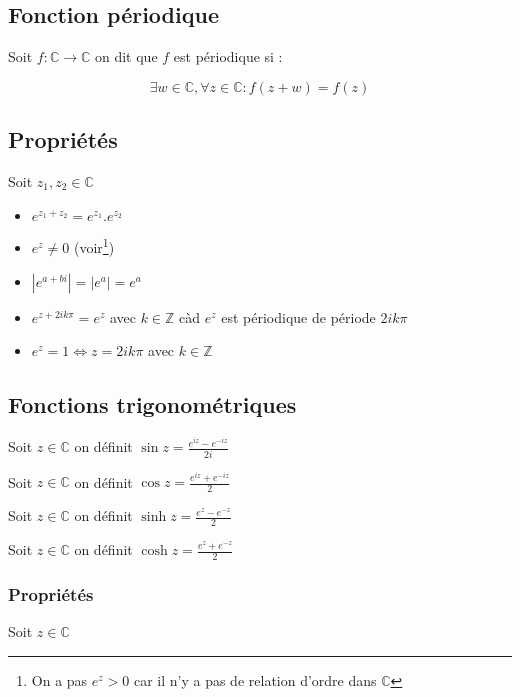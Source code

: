 \documentclass[a4paper,10pt]{report}
\newcommand{\ap}{\rightarrow}
\newcommand{\C}{\mathbb{C}}
\newcommand{\Z}{\mathbb{Z}}
\newcommand{\ioi}{\Leftrightarrow}
\newcommand{\abs}[1]{\left\vert #1 \right\vert}
\begin{document}
\subsection{Fonction périodique}

Soit $f:\C \ap \C$ on dit que $f$ est périodique si :

\[\exists w \in \C , \forall z \in \C : f(z+w) = f(z)\]

\subsection{Propriétés}

Soit $z_1,z_2 \in \C$

\begin{itemize}
\item{$e^{z_1+z_2} = e^{z_1} . e^{z_2}$}
\item{$e^z \neq 0$ (voir\footnote{On a pas $e^z > 0$ car il n'y a pas de relation d'ordre dans $\C$})}
\item{$\abs{e^{a+bi}} = \abs{e^a} = e^a$}
\item{$e^{z+2ik\pi} = e^z$ avec $k \in \Z$ càd $e^z$ est périodique de période $2ik\pi$}
\item{$e^z = 1 \ioi z= 2ik\pi$ avec $k \in \Z$}
\end{itemize}


\subsection{Fonctions trigonométriques}

Soit $z \in \C$ on définit $\sin z = \frac{e^{iz} - e^{-iz}}{2i}$

Soit $z \in \C$ on définit $\cos z = \frac{e^{iz} + e^{-iz}}{2}$

Soit $z \in \C$ on définit $\sinh z = \frac{e^z - e^{-z}}{2}$

Soit $z \in \C$ on définit $\cosh z = \frac{e^z + e^{-z}}{2}$

\subsubsection{Propriétés}

Soit $z \in \C$
\end{document}
